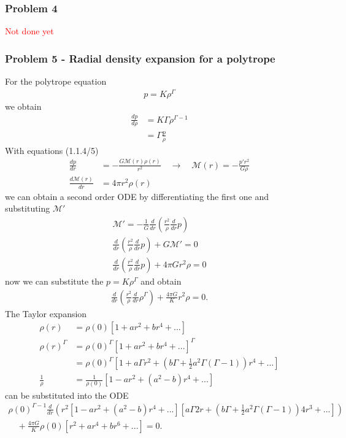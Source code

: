 \documentclass[10pt,a4paper]{book}
\theoremstyle{definition}
\begin{document}
\subsubsection{Problem 4}
\textcolor{red}{Not done yet}

\subsubsection{Problem 5 - Radial density expansion for a polytrope}
For the polytrope equation 
\begin{align}
    p=K\rho^\Gamma
\end{align}
we obtain
\begin{align}
    \frac{dp}{d\rho}&=K\Gamma\rho^{\Gamma-1}\\
    &=\Gamma\frac{p}{\rho}
\end{align}
With equations (1.1.4/5)
\begin{align}
    \frac{dp}{dr}   &= -\frac{G\mathcal{M}(r)\rho(r)}{r^2}\quad\rightarrow\quad\mathcal{M}(r)=-\frac{p'r^2}{G\rho}\\
    \frac{d\mathcal{M}(r)}{dr} &= 4\pi r^2\rho(r)
\end{align}
we can obtain a second order ODE by differentiating the first one and substituting $\mathcal{M}'$
\begin{align}
    \mathcal{M}'=-\frac{1}{G}\frac{d}{dr}\left(\frac{r^2}{\rho}\frac{d}{dr}p\right)\\
    \frac{d}{dr}\left(\frac{r^2}{\rho}\frac{d}{dr}p\right)+G\mathcal{M}'=0\\
    \frac{d}{dr}\left(\frac{r^2}{\rho}\frac{d}{dr}p\right)+4\pi Gr^2\rho=0
\end{align}
now we can substitute the $p=K\rho^\Gamma$ and obtain
\begin{align}
    \frac{d}{dr}\left(\frac{r^2}{\rho}\frac{d}{dr}\rho^\Gamma\right)+\frac{4\pi G}{K}r^2\rho=0.
\end{align}
The Taylor expansion 
\begin{align}
    \rho(r)&=\rho(0)\left[1+ar^2+br^4+...\right]\\
    \rho(r)^\Gamma&=\rho(0)^\Gamma\left[1+ar^2+br^4+...\right]^\Gamma\\
    &=\rho(0)^\Gamma\left[1+a\Gamma r^2+\left(b\Gamma+\frac{1}{2}a^2\Gamma(\Gamma-1)\right)r^4+...\right]\\
    \frac{1}{\rho}&=\frac{1}{\rho(0)}\left[1-a r^2+(a^2-b)r^4+...\right]
\end{align}
can be substituted into the ODE
\begin{align}
    \rho(0)^{\Gamma-1}\frac{d}{dr}\left(r^2\left[1-a r^2+(a^2-b)r^4+...\right]\left[a\Gamma 2r+\left(b\Gamma+\frac{1}{2}a^2\Gamma(\Gamma-1)\right)4r^3+...\right]\right)\\
    \quad+\frac{4\pi G}{K}\rho(0)\left[r^2+ar^4+br^6+...\right]=0.
\end{align}
\end{document}
